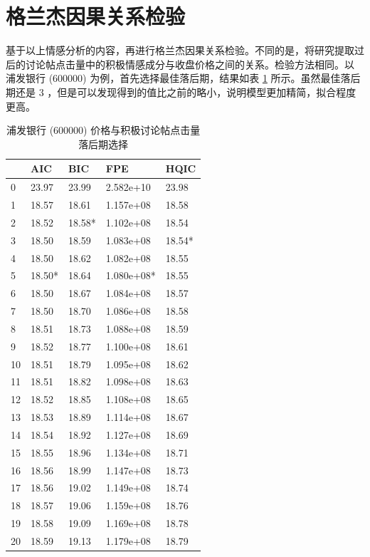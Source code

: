 \section{格兰杰因果关系检验}

基于以上情感分析的内容，再进行格兰杰因果关系检验。不同的是，将研究提取过后的讨论帖点击量中的积极情感成分与收盘价格之间的关系。检验方法相同。以 浦发银行 (600000) 为例，首先选择最佳落后期，结果如表 \ref{price_click_count:8} 所示。虽然最佳落后期还是 $3$ ，但是可以发现得到的值比之前的略小，说明模型更加精简，拟合程度更高。

\begin{table}
  \centering
  \caption{浦发银行 (600000) 价格与积极讨论帖点击量落后期选择}
  \label{price_click_count:8}
  \begin{tabularx}{0.75\textwidth}{XXXXX}
    \toprule
    & AIC & BIC & FPE & HQIC \\
    \midrule
    0 & 23.97 & 23.99 & 2.582e+10 & 23.98 \\
    1 & 18.57 & 18.61 & 1.157e+08 & 18.58 \\
    2 & 18.52 & 18.58* & 1.102e+08 & 18.54 \\
    3 & 18.50 & 18.59 & 1.083e+08 & 18.54* \\
    4 & 18.50 & 18.62 & 1.082e+08 & 18.55 \\
    5 & 18.50* & 18.64 & 1.080e+08* & 18.55 \\
    6 & 18.50 & 18.67 & 1.084e+08 & 18.57 \\
    7 & 18.50 & 18.70 & 1.086e+08 & 18.58 \\
    8 & 18.51 & 18.73 & 1.088e+08 & 18.59 \\
    9 & 18.52 & 18.77 & 1.100e+08 & 18.61 \\
    10 & 18.51 & 18.79 & 1.095e+08 & 18.62 \\
    11 & 18.51 & 18.82 & 1.098e+08 & 18.63 \\
    12 & 18.52 & 18.85 & 1.108e+08 & 18.65 \\
    13 & 18.53 & 18.89 & 1.114e+08 & 18.67 \\
    14 & 18.54 & 18.92 & 1.127e+08 & 18.69 \\
    15 & 18.55 & 18.96 & 1.134e+08 & 18.71 \\
    16 & 18.56 & 18.99 & 1.147e+08 & 18.73 \\
    17 & 18.56 & 19.02 & 1.149e+08 & 18.74 \\
    18 & 18.57 & 19.06 & 1.159e+08 & 18.76 \\
    19 & 18.58 & 19.09 & 1.169e+08 & 18.78 \\
    20 & 18.59 & 19.13 & 1.179e+08 & 18.79 \\
    \bottomrule
  \end{tabularx}
\end{table}

